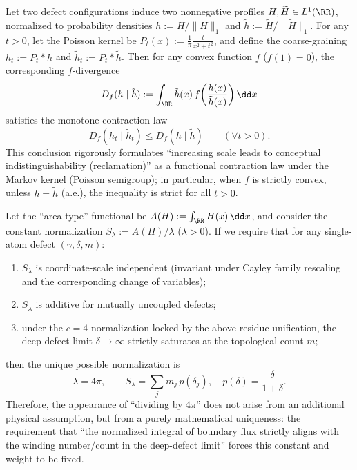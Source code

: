 \begin{proposition}
Let two defect configurations induce two nonnegative profiles \(H,\widetilde H\in L^{1}(\RR)\), normalized to probability densities
\(
h:=H/\|H\|_{1}
 \) and \(
\tilde h:=\widetilde H/\|\widetilde H\|_{1}
 \).
For any \(t>0\), let the Poisson kernel be \(P_t(x):=\frac{1}{\pi}\frac{t}{x^{2}+t^{2}}\), and define the coarse-graining
\(
h_t:=P_t*h
 \) and \(
\tilde h_t:=P_t*\tilde h
 \).
Then for any convex function \(f\) (\(f(1)=0\)), the corresponding \(f\)-divergence
\[
D_f(h\mid \tilde h):=\int_{\RR}\tilde h(x)\,f\!\left(\frac{h(x)}{\tilde h(x)}\right)\dd x
\]
satisfies the monotone contraction law
\[
\boxed{\;
D_f(h_t\mid \tilde h_t)\le D_f(h\mid \tilde h)\qquad(\forall t>0).\;}
\]
This conclusion rigorously formulates ``increasing scale leads to conceptual indistinguishability (reclamation)'' as a functional contraction law under the Markov kernel (Poisson semigroup); in particular, when \(f\) is strictly convex, unless \(h=\tilde h\) (a.e.), the inequality is strict for all \(t>0\).
\end{proposition}

\begin{proposition}
Let the ``area-type'' functional be
\(
A(H):=\int_{\RR}H(x)\,\dd x
 \), and consider the constant normalization
\(
S_{\lambda}:=A(H)/\lambda
 \) (\(\lambda>0\)).
If we require that for any single-atom defect \((\gamma,\delta,m)\):
\begin{enumerate}
  \item \(S_{\lambda}\) is coordinate-scale independent (invariant under Cayley family rescaling and the corresponding change of variables);
  \item \(S_{\lambda}\) is additive for mutually uncoupled defects;
  \item under the \(c=4\) normalization locked by the above residue unification, the deep-defect limit \(\delta\to\infty\) strictly saturates at the topological count \(m\);
\end{enumerate}
then the unique possible normalization is
\[
\boxed{\;\lambda=4\pi,\qquad
S_{\lambda}=\sum_{j}m_j\,p(\delta_j),\quad p(\delta)=\frac{\delta}{1+\delta}.\;}
\]
Therefore, the appearance of ``dividing by \(4\pi\)'' does not arise from an additional physical assumption, but from a purely mathematical uniqueness: the requirement that ``the normalized integral of boundary flux strictly aligns with the winding number/count in the deep-defect limit'' forces this constant and weight to be fixed.
\end{proposition}

